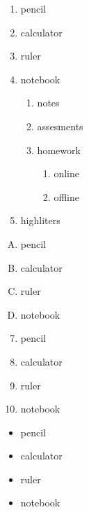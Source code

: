 \documentclass[11pt]{article}
\begin{document}
	\begin{enumerate}
	
		\item pencil
		\item calculator
		\item ruler
		\item notebook
		
			\begin{enumerate}
				\item notes
				\item assesments				
				\item homework
				
					\begin{enumerate}
					
						\item online
						\item offline

					\end{enumerate}
					
			\end{enumerate}
	
		\item highliters

	\end{enumerate}
	
	\vspace{2px}	
	
	\begin{enumerate}[A.]
	
		\item pencil
		\item calculator
		\item ruler
		\item notebook
	
	\end{enumerate}
	
	\vspace{2px}
	
	\begin{enumerate} \setcounter{enumi}{6}
	
		\item pencil
		\item calculator
		\item ruler
		\item notebook
 
	\end{enumerate}
	
	\vspace{2px}
	
	\begin{itemize}
		\item pencil
		\item calculator
		\item ruler
		\item notebook
	\end{itemize}
	
\end{document}
